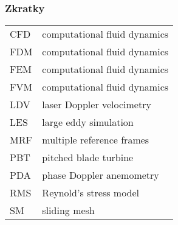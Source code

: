 \subsubsection*{Zkratky}
\begin{tabularx}{\textwidth}{@{}p{1.0cm} X }
	
CFD & computational fluid dynamics  \\
FDM & computational fluid dynamics  \\
FEM & computational fluid dynamics  \\
FVM & computational fluid dynamics  \\
LDV & laser Doppler velocimetry  \\
LES & large eddy simulation \\
MRF & multiple reference frames \\
PBT & pitched blade turbine \\
PDA & phase Doppler anemometry \\
RMS & Reynold's stress model\\
SM & sliding mesh
\end{tabularx}

